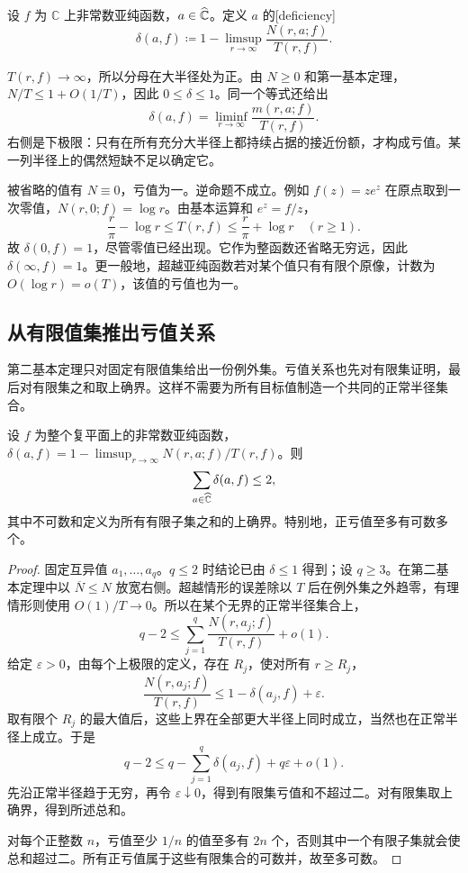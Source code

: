 \begin{definition}[亏值]\label{b3:def:C-deficiency}
设 \(f\) 为 \(\mathbb C\) 上非常数亚纯函数，\(a\in\widehat{\mathbb C\kern0pt}\)。定义 \(a\) 的[deficiency]
\[
 \delta(a,f)\coloneqq1-\limsup_{r\to\infty}\frac{N(r,a;f)}{T(r,f)}.
\]
\end{definition}

\(T(r,f)\to\infty\)，所以分母在大半径处为正。由 \(N\ge0\) 和第一基本定理，\(N/T\le1+O(1/T)\)，因此 \(0\le\delta\le1\)。同一个等式还给出
\begin{equation}\label{b3:eq:C-defect-proximity}
 \delta(a,f)=\liminf_{r\to\infty}\frac{m(r,a;f)}{T(r,f)}.
\end{equation}
右侧是下极限：只有在所有充分大半径上都持续占据的接近份额，才构成亏值。某一列半径上的偶然短缺不足以确定它。

\ProseParagraphBreak

被省略的值有 \(N\equiv0\)，亏值为一。逆命题不成立。例如 \(f(z)=ze^z\) 在原点取到一次零值，\(N(r,0;f)=\log r\)。由基本运算和 \(e^z=f/z\)，
\[
 \frac r\pi-\log r\le T(r,f)\le\frac r\pi+\log r
 \quad(r\ge1).
\]
故 \(\delta(0,f)=1\)，尽管零值已经出现。它作为整函数还省略无穷远，因此 \(\delta(\infty,f)=1\)。更一般地，超越亚纯函数若对某个值只有有限个原像，计数为 \(O(\log r)=o(T)\)，该值的亏值也为一。

\subsection{从有限值集推出亏值关系}
\label{b3:subsec:C0402}

第二基本定理只对固定有限值集给出一份例外集。亏值关系也先对有限集证明，最后对有限集之和取上确界。这样不需要为所有目标值制造一个共同的正常半径集合。

\begin{theorem}[亏值关系]\label{b3:thm:C-defect-relation}
设 \(f\) 为整个复平面上的非常数亚纯函数，\(\delta(a,f)=1-\limsup_{r\to\infty}N(r,a;f)/T(r,f)\)。则
\[
 \sum_{a\in\widehat{\mathbb C\kern0pt}}\delta(a,f)\le2,
\]
其中不可数和定义为所有有限子集之和的上确界。特别地，正亏值至多有可数多个。
\end{theorem}
\begin{proof}
固定互异值 \(a_1,\ldots,a_q\)。\(q\le2\) 时结论已由 \(\delta\le1\) 得到；设 \(q\ge3\)。在第二基本定理中以 \(\overline N\le N\) 放宽右侧。超越情形的误差除以 \(T\) 后在例外集之外趋零，有理情形则使用 \(O(1)/T\to0\)。所以在某个无界的正常半径集合上，
\[
 q-2\le\sum_{j=1}^q\frac{N(r,a_j;f)}{T(r,f)}+o(1).
\]
给定 \(\varepsilon>0\)，由每个上极限的定义，存在 \(R_j\)，使对所有 \(r\ge R_j\)，
\[
 \frac{N(r,a_j;f)}{T(r,f)}
 \le1-\delta(a_j,f)+\varepsilon.
\]
取有限个 \(R_j\) 的最大值后，这些上界在全部更大半径上同时成立，当然也在正常半径上成立。于是
\[
 q-2\le q-\sum_{j=1}^q\delta(a_j,f)+q\varepsilon+o(1).
\]
先沿正常半径趋于无穷，再令 \(\varepsilon\downarrow0\)，得到有限集亏值和不超过二。对有限集取上确界，得到所述总和。

对每个正整数 \(n\)，亏值至少 \(1/n\) 的值至多有 \(2n\) 个，否则其中一个有限子集就会使总和超过二。所有正亏值属于这些有限集合的可数并，故至多可数。
\end{proof}

